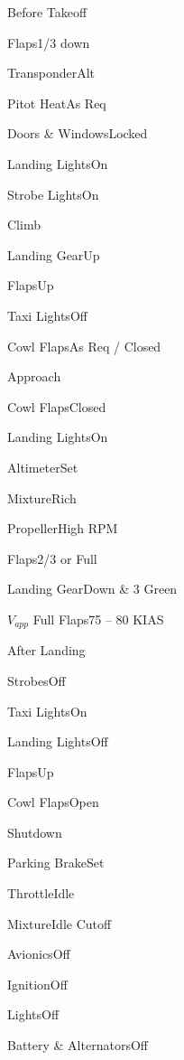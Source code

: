 \documentclass[sim-use, halfpage]{checklist}
\begin{document}
\begin{checklist}{Before Takeoff}
  \item{Flaps}{1/3 down}
  \item{Transponder}{Alt}
  \item{Pitot Heat}{As Req}
  \item{Doors \& Windows}{Locked}
  \item{Landing Lights}{On}
  \item{Strobe Lights}{On}
\end{checklist}

\begin{checklist}{Climb}
  \item{Landing Gear}{Up}
  \item{Flaps}{Up}
  \item{Taxi Lights}{Off}
  \item{Cowl Flaps}{As Req / Closed}
\end{checklist}

\begin{checklist}{Approach}
  \item{Cowl Flaps}{Closed}
  \item{Landing Lights}{On}
  \item{Altimeter}{Set}
  \item{Mixture}{Rich}
  \item{Propeller}{High RPM}
  \item{Flaps}{2/3 or Full}
  \item{Landing Gear}{Down \& 3 Green}
  \item{$V_{app}$ Full Flaps}{75 -- 80 KIAS}
\end{checklist}

\begin{checklist}{After Landing}
  \item{Strobes}{Off}
  \item{Taxi Lights}{On}
  \item{Landing Lights}{Off}
  \item{Flaps}{Up}
  \item{Cowl Flaps}{Open}
\end{checklist}

\begin{checklist}{Shutdown}
  \item{Parking Brake}{Set}
  \item{Throttle}{Idle}
  \item{Mixture}{Idle Cutoff}
  \item{Avionics}{Off}
  \item{Ignition}{Off}
  \item{Lights}{Off}
  \item{Battery \& Alternators}{Off}
\end{checklist}
\end{document}
